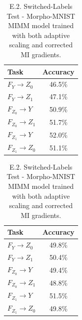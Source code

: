 \documentclass[12pt,DIV14,BCOR12mm,a4paper,footinclude=false,headinclude,parskip=half-,twoside,openright,cleardoublepage=empty,toc=index,bibliography=totoc,listof=totoc]{scrreprt}
\numberwithin{equation}{chapter}
\begin{document}
\begin{table}[H]
\centering
\begin{minipage}{.45\linewidth}
\centering
\begin{tabular}{|l|c|}
\hline
\textbf{Task} & \textbf{Accuracy} \\
\hline
$F_Y \rightarrow Z_0$ & 46.5\% \\
$F_Y \rightarrow Z_1$ & 47.1\% \\
\hline
$F_{Z_0} \rightarrow Y$ & 50.9\% \\
$F_{Z_0} \rightarrow Z_1$ & 51.7\% \\
\hline
$F_{Z_1} \rightarrow Y$ & 52.0\% \\
$F_{Z_1} \rightarrow Z_0$ & 51.1\% \\
\hline
\end{tabular}
\caption{E.1. Switched-Labels Test - Morpho-MNIST MIMM model trained without adaptive scaling and corrected MI gradients.}
\label{tab:accuracy_tasks-mmnist_MIMM_noada_nocorr}
\end{minipage}%
\hfill
\begin{minipage}{.45\linewidth}
\centering
\begin{tabular}{|l|c|}
\hline
\textbf{Task} & \textbf{Accuracy} \\
\hline
$F_Y \rightarrow Z_0$ & 49.8\% \\
$F_Y \rightarrow Z_1$ & 50.4\% \\
\hline
$F_{Z_0} \rightarrow Y$ & 49.4\% \\
$F_{Z_0} \rightarrow Z_1$ & 48.8\% \\
\hline
$F_{Z_1} \rightarrow Y$ & 51.5\% \\
$F_{Z_1} \rightarrow Z_0$ & 49.8\% \\
\hline
\end{tabular}
\caption{E.2. Switched-Labels Test - Morpho-MNIST MIMM model trained with both adaptive scaling and corrected MI gradients.}
\label{tab:accuracy_tasks-mmnist_MIMM_ada_corr}
\end{minipage}%
\end{table}

\vspace{-2.5cm}
\end{document}
